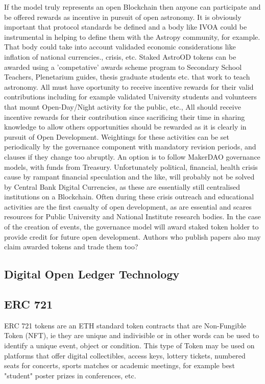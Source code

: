 \documentclass[final,5p,times,twocolumn,authoryear]{elsarticle}
\begin{document}
If the  model truly represents an open Blockchain then anyone can participate and be offered rewards as incentive in pursuit of open astronomy. It is obviously important that protocol standards be defined and a body like IVOA could be instrumental in helping to define them with the Astropy community, for example. That body could take into account validaded economic considerations like inflation of national currencies., crisis, etc. Staked AstroOD tokens can be awarded using a 'competative' awards scheme program to Secondary School Teachers, Plenetarium guides, thesis graduate students etc. that work to teach astronomy. All must have oportunity to receive incentive rewards for their valid contributions including for example validated University students and volunteers that mount Open-Day/Night activity for the public, etc., All should receive incentive rewards for their contribution since sacrificing their time in sharing knowledge to allow others opportunities should be rewarded as it is clearly in pursuit of Open Development. Weightings for these activities can be set periodically by the governance component with mandatory revision periods, and clauses if they change too abruptly. An option is to follow MakerDAO governance models, with funds from Treasury. Unfortunately political, financial, health  crisis cause by rampant financial speculation and the like, will probably not be solved by Central Bank Digital Currencies, as these are essentially still centralised institutions on a Blockchain.  Often during these crisis outreach and educational activities are the first casualty of open development, as are essential and scares resources for Public University and National Institute research bodies. In the case of the creation of events, the governance model will award staked token holder to provide credit for future open development. Authors who publish papers also may claim awarded tokens and trade them too?

\subsection{Digital Open Ledger Technology}

\subsection{ERC 721 }

ERC 721 tokens are an ETH standard token contracts that are Non-Fungible Token (NFT), ie they are unique and indivisible or in other words can be used to identify a unique event, object or condition. This type of Token may be used on platforms that offer digital collectibles, access keys, lottery tickets, numbered seats for concerts, sports matches or academic meetings, for example best "student" poster prizes in conferences, etc. 
\end{document}
